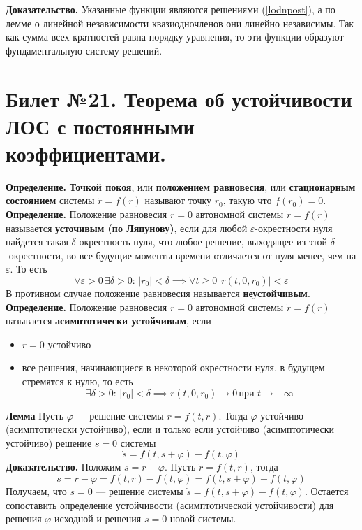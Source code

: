\documentclass{article}
\begin{document}
\noindent \textbf{Доказательство.} Указанные функции являются решениями (\ref{lodnpost}), а по лемме о линейной независимости квазиодночленов они линейно независимы. Так как сумма всех кратностей равна порядку уравнения, то эти функции образуют фундаментальную систему решений.

\section{Билет №21. Теорема об устойчивости ЛОС с постоянными коэффициентами.}
\textbf{Определение.} \textbf{Точкой покоя}, или \textbf{положением равновесия}, или \textbf{стационарным состоянием} системы $\dot{r} = f(r)$ называют точку $r_0$, такую что $f(r_0) = 0$.\\

\noindent \textbf{Определение.} Положение равновесия $r = 0$ автономной системы $\dot{r} = f(r)$ называется \textbf{усточивым (по Ляпунову)}, если для любой $\varepsilon$-окрестности нуля найдется такая $\delta$-окрестность нуля, что любое решение, выходящее из этой $\delta$-окрестности, во все будущие моменты времени отличается от нуля менее, чем на $\varepsilon$. То есть
\begin{equation*}
    \forall \varepsilon > 0 \, \exists \delta > 0:\, |r_0| < \delta \implies \forall t \ge 0 \, |r(t,0,r_0)| < \varepsilon
\end{equation*}
В противном случае положение равновесия называется \textbf{неустойчивым}.\\

\noindent \textbf{Определение.} Положение равновесия $r = 0$ автономной системы $\dot{r} = f(r)$ называется \textbf{асимптотически устойчивым}, если
\begin{itemize}
    \item $r = 0$ устойчиво
    \item все решения, начинающиеся в некоторой окрестности нуля, в будущем стремятся к нулю, то есть
    \begin{equation*}
        \exists \delta > 0:\, |r_0| < \delta \implies r(t,0,r_0) \to 0\, \text{при } t \to +\infty
    \end{equation*}
\end{itemize}

\noindent \textbf{Лемма} Пусть $\varphi$ --- решение системы $\dot{r} = f(t,r)$. Тогда $\varphi$ устойчиво (асимптотически устойчиво), если и только если устойчиво (асимптотически устойчиво) решение $s = 0$ системы
\begin{equation*}
    \dot{s} = f(t, s + \varphi) - f(t, \varphi)
\end{equation*}
\noindent \textbf{Доказательство.} Положим $s = r - \varphi$. Пусть $\dot{r} = f(t,r)$, тогда
\begin{equation*}
    \dot{s} = \dot{r} - \dot{\varphi} = f(t,r) - f(t,\varphi) = f(t, s + \varphi) - f(t,\varphi)
\end{equation*}
Получаем, что $s = 0$ --- решение системы $\dot{s} = f(t, s + \varphi) - f(t,\varphi)$. Остается сопоставить определение устойчивости (асимптотической устойчивости) для решения $\varphi$ исходной и решения $s = 0$ новой системы.\\
\end{document}
